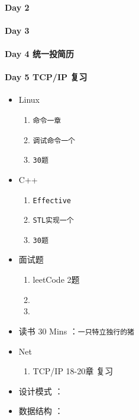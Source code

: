 \documentclass[UTF8,a4paper,8pt]{ctexart}
\begin{document}
 	 \paragraph{Day 2       \quad     }
 	 \paragraph{Day 3       \quad     }
 	 \paragraph{Day 4  统一投简历     \quad     }
 	 \paragraph{Day 5  TCP/IP 复习    \quad     }
	 	 \begin{itemize}[itemindent = 1em]
	 	 	\renewcommand\labelitemi{\makebox[0pt][l]{$\square$}\hspace{1em}} 
	 	 	\renewcommand\labelitemi{\makebox[0pt][l]{$\square$}\raisebox{.15ex}{\hspace{0.1em}$\checkmark$}}	 	
	 	 	\item   Linux 
	 	 	\begin{enumerate}
	 	 		\item \verb|命令一章|
	 	 		\item \verb|调试命令一个|
	 	 		\item \verb|30题|
	 	 	\end{enumerate}
	 	 	\item   C++   
	 	 	\begin{enumerate}
	 	 		\item \verb|Effective|
	 	 		\item \verb|STL实现一个|
	 	 		\item \verb|30题|
	 	 	\end{enumerate}
	 	 	
	 	 	\item  面试题
	 	 	\begin{enumerate}
	 	 		\item leetCode 2题
	 	 		\item 
	 	 		\item 
	 	 	\end{enumerate}
	 	 	
	 	 	\item   读书  30 Mins	：\verb|一只特立独行的猪|
	 	 	\item   Net
	 	 	\begin{enumerate}
	 	 		\item TCP/IP  18-20章 复习
	 	 	\end{enumerate}	
	 	 	
	 	 	\renewcommand\labelitemi{\makebox[0pt][l]{$\square$}\hspace{1em}}
	 	 	\item   设计模式 ：\verb|| 
	 	 	\item   数据结构 ：\verb|| 
	 	 \end{itemize}
\end{document}
